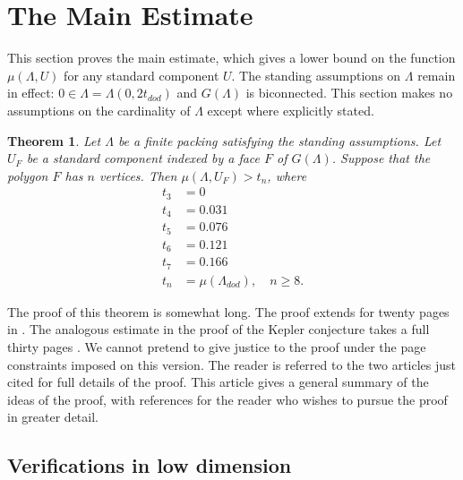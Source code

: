 \documentclass{article} %
\newtheorem{theorem}{Theorem}[section]
\begin{document}

\section{The Main Estimate}

This section proves the main estimate, which gives a lower bound on
the function $\mu(\Lambda,U)$ for any standard component $U$. The
standing assumptions on $\Lambda$ remain in effect: $0\in\Lambda=
\Lambda(0,2t_{dod})$ and $G(\Lambda)$ is biconnected. This section
makes no assumptions on the cardinality of $\Lambda$ except where
explicitly stated.

\begin{theorem}\label{thm:main}  
Let $\Lambda$ be a finite packing satisfying the
standing assumptions.  Let $U_F$ be a standard component indexed by
a face $F$ of $G(\Lambda)$.  Suppose that the polygon 
$F$ has $n$ vertices.  Then
   $\mu(\Lambda,U_F) > t_n$, where 
$$
\begin{array}{lll}
 t_3 &= 0\\
 t_4 &= 0.031\\
 t_5 &= 0.076\\
 t_6 &= 0.121\\
 t_7 &= 0.166\\
 t_n &= \mu(\Lambda_{dod}),\quad n\ge 8.
\end{array}
$$
\end{theorem}

The proof of this theorem is somewhat long. The proof extends for
twenty pages in \cite[pp.19-38]{Hales:2002:Dodec}. The analogous
estimate in the proof of the Kepler conjecture takes a full thirty
pages \cite[pp.126-156]{Hales:2006:DCG}. We cannot pretend to give
justice to the proof under the page constraints imposed on this
version. The reader is referred to the two articles just cited for
full details of the proof. This article gives a general summary of the
ideas of the proof, with references for the reader who wishes to
pursue the proof in greater detail.

\subsection{Verifications in low dimension}
\end{document}
